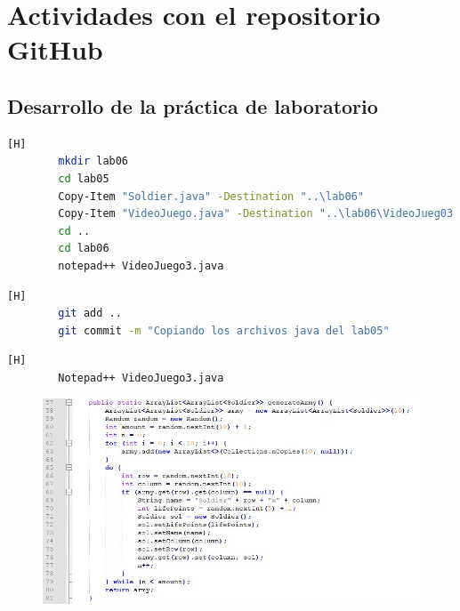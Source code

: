 \documentclass{article}
\begin{document}
	\section{Actividades con el repositorio GitHub}
	
	\subsection{Desarrollo de la práctica de laboratorio}
	
	\begin{lstlisting}[language=bash,caption={Inicializando el espacio de trabajo}][H]
		mkdir lab06
		cd lab05
		Copy-Item "Soldier.java" -Destination "..\lab06"
		Copy-Item "VideoJuego.java" -Destination "..\lab06\VideoJueg03.java"
		cd ..
		cd lab06
		notepad++ VideoJuego3.java
	\end{lstlisting}
	
	\begin{lstlisting}[language=bash,caption={Commit: Copiando los archivos java del lab05 }][H]
		git add ..
		git commit -m "Copiando los archivos java del lab05"
	\end{lstlisting}
	
	\begin{lstlisting}[language=bash,caption={Se implementa un método que genera un ArrayList bidimensional de Soldier }][H]
		Notepad++ VideoJuego3.java
	\end{lstlisting}
	\begin{figure}[H]
		\centering
		\includegraphics[width=1\textwidth,keepaspectratio]{img/1.jpg}
	\end{figure}
	
\end{document}
